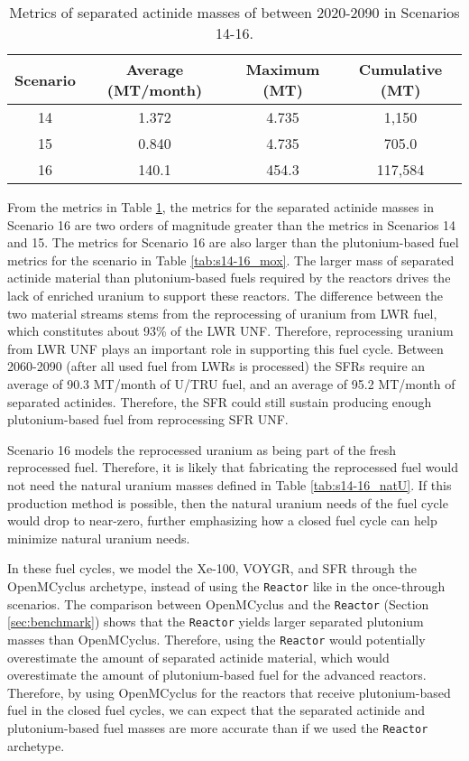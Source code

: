 \begin{table}[h!]
    \centering 
    \caption{Metrics of separated actinide masses of between 2020-2090 in 
    Scenarios 14-16.}
    \label{tab:s14-16_sep_pu}
    \begin{tabular}{c c c c}
        \hline 
        Scenario & Average (MT/month) & Maximum (MT) & Cumulative (MT) \\
        \hline
        14 & 1.372 & 4.735 & 1,150\\
        15 & 0.840 & 4.735 & 705.0\\
        16 & 140.1 & 454.3 & 117,584\\
        \hline
    \end{tabular}
\end{table}

From the metrics in Table \ref{tab:s14-16_sep_pu}, the metrics for 
the separated actinide masses in Scenario 16 are two orders of 
magnitude greater than the metrics in Scenarios 14 and 15. The metrics 
for Scenario 16 are also larger than the plutonium-based fuel metrics 
for the scenario in Table \ref{tab:s14-16_mox}. The larger mass 
of separated actinide material than plutonium-based fuels required by 
the reactors drives the lack of enriched uranium to support these 
reactors. The difference between the two material streams stems 
from the reprocessing of uranium from \gls{LWR} fuel, which constitutes 
about 93\% of the \gls{LWR} \gls{UNF}. Therefore, reprocessing 
uranium from \gls{LWR} \gls{UNF} plays an important role in supporting 
this fuel cycle. Between 2060-2090 (after all used fuel from 
\glspl{LWR} is processed) the \glspl{SFR} require an 
average of 90.3 MT/month of U/TRU fuel, and an average of 95.2 
MT/month of separated actinides. Therefore, the \gls{SFR} could 
still sustain producing enough plutonium-based 
fuel from reprocessing \gls{SFR} \gls{UNF}.

Scenario 16 models the reprocessed uranium as being part of 
the fresh reprocessed fuel. Therefore, it is likely that 
fabricating the reprocessed fuel would not need the natural
uranium masses defined in Table \ref{tab:s14-16_natU}. If this 
production method is possible, then the natural uranium needs 
of the fuel cycle would drop to near-zero, further 
emphasizing how a closed fuel cycle can help minimize
natural uranium needs. 

In these fuel cycles, we model the Xe-100, VOYGR, and \gls{SFR} 
through the OpenMCyclus archetype, instead of using the 
\Cycamore \texttt{Reactor} like in the once-through scenarios. 
The comparison between OpenMCyclus 
and the \Cycamore \texttt{Reactor} (Section \ref{sec:benchmark})
shows that the \Cycamore \texttt{Reactor} yields larger separated 
plutonium masses than OpenMCyclus. Therefore, using the \Cycamore 
\texttt{Reactor} would potentially overestimate the amount of 
separated actinide material, which would overestimate the 
amount of plutonium-based fuel for the advanced reactors. 
Therefore, by using OpenMCyclus for the reactors that 
receive plutonium-based fuel in the closed fuel cycles, we can 
expect that the separated actinide and plutonium-based fuel masses are 
more accurate than if we used the \Cycamore \texttt{Reactor} 
archetype. 

